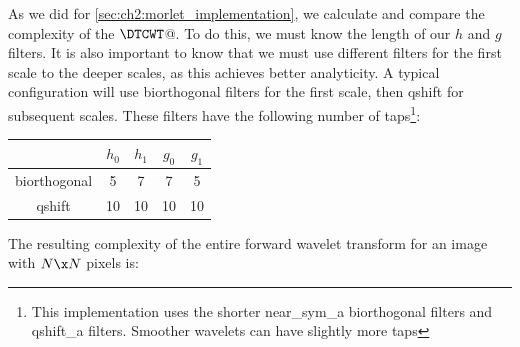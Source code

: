   As we did for \autoref{sec:ch2:morlet_implementation}, we calculate and compare
  the complexity of the $\DTCWT$@. To do this, we must know the length of our
  $h$ and $g$ filters. It is also important to know that we must use different
  filters for the first scale to the deeper scales, as this achieves better
  analyticity. A typical configuration will use biorthogonal filters for the
  first scale, then qshift for subsequent scales.
  These filters have the following number of taps\footnote{This implementation
  uses the shorter near\_sym\_a biorthogonal filters and qshift\_a filters.
  Smoother wavelets can have slightly more taps}:
    \begin{center}
    \begin{tabular}{ccccc} \hline
                   & $h_0$ & $h_1$ & $g_0$ & $g_1$ \\\hline
      biorthogonal & 5     & 7     & 7     & 5     \\
      qshift       & 10    & 10    & 10    & 10      
    \end{tabular}
    \end{center}
  The resulting complexity of the entire forward wavelet transform for an image
  with $N\x N$ pixels is:

